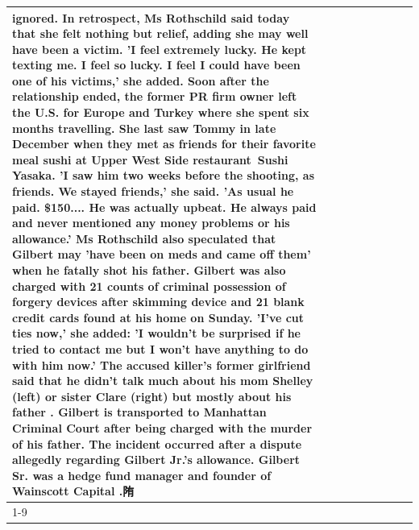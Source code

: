 \begin{table}[H]
\begin{tabular}{lllrlllll}
ignored. In retrospect, Ms Rothschild said today that she felt nothing but relief, adding she may well have been a victim. 'I feel extremely lucky. He kept texting me. I feel so lucky. I feel I could have been one of his victims,' she added. Soon after the relationship ended, the former PR firm owner left the U.S. for Europe and Turkey where she spent six months  travelling. She last saw Tommy in late December when they met as friends for their favorite meal sushi at Upper West Side restaurant Sushi Yasaka. 'I saw him two weeks before the shooting, as friends. We stayed friends,' she said. 'As usual he paid. \$150.... He was actually upbeat. He always paid and never mentioned any money problems or his allowance.' Ms Rothschild also speculated that Gilbert may 'have been on meds and came off them' when he fatally shot his father. Gilbert was also charged with 21 counts of criminal possession of forgery devices after skimming device and 21 blank credit cards found at his home on Sunday. 'I've cut ties now,' she added: 'I wouldn’t be surprised if he tried to contact me but I won’t have anything to do with him now.' The accused killer's former girlfriend said that he didn't talk much about his mom Shelley (left) or sister Clare (right) but mostly about his father . Gilbert is transported to Manhattan Criminal Court  after being charged with the murder of his father. The incident occurred after a dispute allegedly regarding Gilbert Jr.'s allowance. Gilbert Sr. was a hedge fund manager and founder of Wainscott Capital .陏 \\
\cline{1-9}

\end{tabular}
\end{table}
